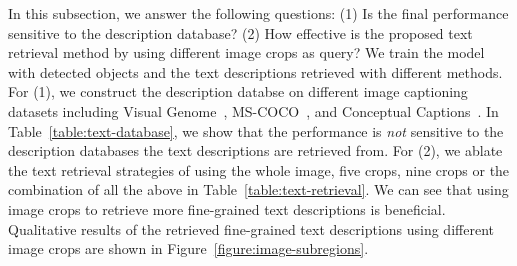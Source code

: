 \documentclass[10pt,twocolumn,letterpaper]{article}
\begin{document}
In this subsection, we answer the following questions: (1) Is the final performance sensitive to the description database? (2) How effective is the proposed text retrieval method by using different image crops as query?
We train the  model with detected objects and the text descriptions retrieved with different methods.
For (1), we construct the description databse on different image captioning datasets including Visual Genome~\cite{krishnavisualgenome}, MS-COCO~\cite{lin2014microsoft}, and Conceptual Captions~\cite{sharma2018conceptual}.
In Table~\ref{table:text-database}, we show that the performance is \textit{not} sensitive to the description databases the text descriptions are retrieved from.
For (2), we ablate the text retrieval strategies of using the whole image, five crops, nine crops or the combination of all the above in Table~\ref{table:text-retrieval}.
We can see that using image crops to retrieve more fine-grained text descriptions is beneficial.
Qualitative results of the retrieved fine-grained text descriptions using different image crops are shown in Figure~\ref{figure:image-subregions}.
\end{document}
